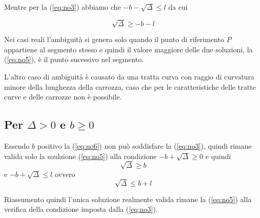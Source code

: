 Mentre per la (\ref{eq:no3}) abbiamo che $-b-\sqrt\Delta\le l$ da cui

\begin{equation}
  \sqrt\Delta\ge -b-l
\end{equation}

Nei casi reali l'ambiguit\`a si genera solo quando il punto di riferimento
$P$ appartiene al segmento stesso e quindi il valore maggiore delle due
soluzioni, la (\ref{eq:no5}), \`e il punto sucessivo nel segmento.

L'altro caso di ambiguit\`a \`e causato da una tratta curva con
raggio di curvatura minore della lunghezza della carrozza, caso che per le
caratteristiche delle tratte curve e delle carrozze non \`e possibile.

\subsection{Per $\Delta>0$ e $b\ge0$}

Essendo $b$ positivo la (\ref{eq:no6}) non pu\`o soddisfare la
(\ref{eq:no3}), quindi rimane valida solo la soulzione (\ref{eq:no5})
alla condizione $-b+\sqrt\Delta\ge 0$ e
quindi
\begin{displaymath}
  \sqrt\Delta\ge b
\end{displaymath}
e $-b+\sqrt\Delta\le l$
ovvero
\begin{equation}
  \sqrt\Delta\le b+l      
\end{equation}

Riassumento quindi l'unica soluzione realmente valida rimane la
(\ref{eq:no5}) alla verifica della condizione imposta dalla (\ref{eq:no3}).
